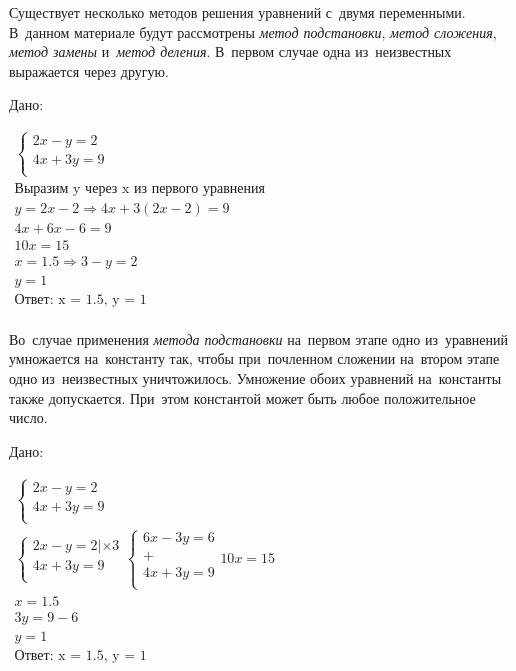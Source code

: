 \documentclass[]{scrartcl}
\begin{document}
Существует несколько методов решения уравнений с~двумя переменными. В~данном материале будут рассмотрены \emph{метод подстановки}, \emph{метод сложения}, \emph{метод замены} и~\emph{метод деления}. В~первом случае одна из~неизвестных выражается через другую.
\begin{Thexmpl}\label{ex:sys1}
	Дано:
	
	$\begin{aligned}
		\begin{cases}
			2x-y=2 \\
			4x+3y = 9\\
		\end{cases}\\
		\text{Выразим y через x из первого уравнения}\\
		y=2x-2 \Rightarrow 4x+3(2x-2) = 9 \\
		4x+6x-6 = 9 \\
		10x = 15 \\
		x = 1.5 \Rightarrow 3-y=2 \\
		y = 1 \\
		\text{Ответ: x = 1.5, y = 1} \\
		\end{aligned}$
	\end{Thexmpl}
Во~случае применения \emph{метода подстановки} на~первом этапе одно из~уравнений умножается на~константу так, чтобы при~почленном сложении на~втором этапе одно из~неизвестных уничтожилось. Умножение обоих уравнений на~константы также допускается. При~этом константой может быть любое положительное число.
\begin{Thexmpl}\label{ex:sys2}
	Дано:
	
	$\begin{aligned}
	\begin{cases}
	2x-y=2 \\
	4x+3y=9\\
	\end{cases}\\
	\begin{cases}
	2x-y=2 | \times3 \\
	4x+3y=9\\
	\end{cases}
	\begin{cases}
	6x-3y=6\\
	+\\
	4x+3y=9\\
	\end{cases}
	10x=15\\
	x=1.5\\
	3y=9-6\\
	y=1\\
	\text{Ответ: x = 1.5, y = 1} \\
	\end{aligned}$
\end{Thexmpl}
\end{document}
